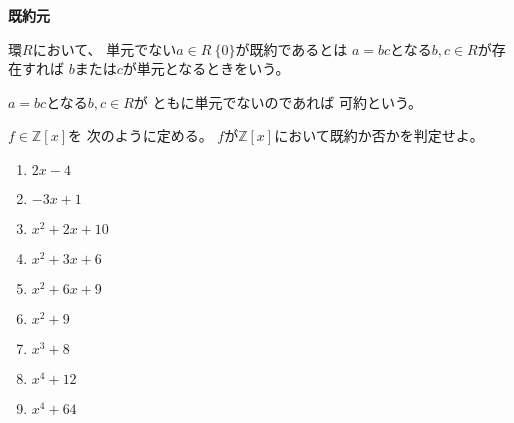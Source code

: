 \documentclass[12pt,b5paper]{ltjsarticle}
\begin{document}
\hrulefill

\textbf{既約元}

環$R$において、
単元でない$a\in R\ \{0\}$が既約であるとは
$a=bc$となる$b,c\in R$が存在すれば
$b$または$c$が単元となるときをいう。

$a=bc$となる$b,c\in R$が
ともに単元でないのであれば
可約という。

\hrulefill

$f\in\mathbb{Z}[x]$を
次のように定める。
$f$が$\mathbb{Z}[x]$において既約か否かを判定せよ。
\begin{enumerate}
 \item $2x-4$
 \item $-3x+1$
 \item $x^2 + 2x + 10$
 \item $x^2 + 3x + 6$
 \item $x^2 + 6x + 9$
 \item $x^2 + 9$
 \item $x^3 + 8$
 \item $x^4 + 12$
 \item $x^4 + 64$
\end{enumerate}

\dotfill
\end{document}
